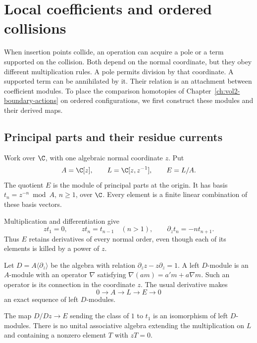 \chapter{Local coefficients and ordered collisions}
\label{ch:vol2-coefficients}

When insertion points collide, an operation can acquire a pole or a
term supported on the collision. Both depend on the normal coordinate,
but they obey different multiplication rules. A pole permits division
by that coordinate. A supported term can be annihilated by it.
Their relation is an attachment between coefficient modules.
To place the comparison homotopies of Chapter~\ref{ch:vol2-boundary-actions}
on ordered configurations, we first construct these modules and their
derived maps.

\section{Principal parts and their residue currents}
\label{sec:vol2-principal-parts}

Work over $\C$, with one algebraic normal coordinate $z$. Put
\[
 A=\C[z],\qquad L=\C[z,z^{-1}],\qquad E=L/A.
\]
The quotient $E$ is the module of principal parts at the origin.
It has basis $t_n=z^{-n}\bmod A$, $n\geq1$, over $\C$.
Every element is a finite linear combination of these basis vectors.

Multiplication and differentiation give
\begin{equation}\label{eq:vol2-normal-jets}
 zt_1=0,\qquad zt_n=t_{n-1}\quad(n>1),\qquad
 \partial_z t_n=-nt_{n+1}.
\end{equation}
Thus $E$ retains derivatives of every normal order, even though each
of its elements is killed by a power of $z$.

Let $D=A\langle\partial_z\rangle$ be the algebra with relation
$\partial_z z-z\partial_z=1$. A left $D$-module is an $A$-module
with an operator $\nabla$ satisfying
$\nabla(am)=a'm+a\nabla m$. Such an operator is its connection
in the coordinate $z$. The usual derivative makes
\begin{equation}\label{eq:vol2-localization-sequence}
 0\longrightarrow A\longrightarrow L\longrightarrow E\longrightarrow0
\end{equation}
an exact sequence of left $D$-modules.

\begin{proposition}\label{prop:vol2-normal-module}
The map $D/Dz\to E$ sending the class of $1$ to $t_1$ is an
isomorphism of left $D$-modules. There is no unital associative algebra
extending the multiplication on $L$ and containing a nonzero element
$T$ with $zT=0$.
\end{proposition}

